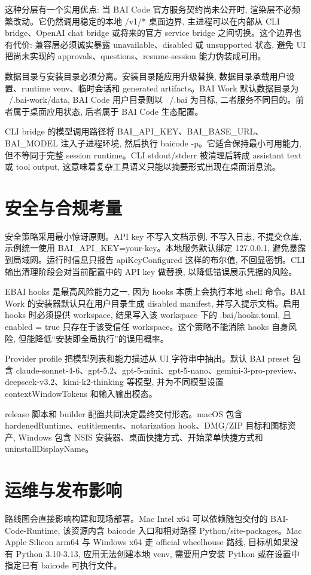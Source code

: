 这种分层有一个实用优点: 当 BAI Code 官方服务契约尚未公开时, 渲染层不必频繁改动。它仍然调用稳定的本地 /v1/* 桌面边界, 主进程可以在内部从 CLI bridge、OpenAI chat bridge 或将来的官方 service bridge 之间切换。这个边界也有代价: 兼容层必须诚实暴露 unavailable、disabled 或 unsupported 状态, 避免 UI 把尚未实现的 approvals、questions、resume-session 能力伪装成可用。

数据目录与安装目录必须分离。安装目录随应用升级替换, 数据目录承载用户设置、runtime venv、临时会话和 generated artifacts。BAI Work 默认数据目录为 ~/.bai-work/data, BAI Code 用户目录则以 ~/.bai 为目标, 二者服务不同目的。前者属于桌面应用状态, 后者属于 BAI Code 生态配置。

CLI bridge 的模型调用路径将 BAI\_API\_KEY、BAI\_BASE\_URL、BAI\_MODEL 注入子进程环境, 然后执行 baicode -p。它适合保持最小可用能力, 但不等同于完整 session runtime。CLI stdout/stderr 被清理后转成 assistant text 或 tool output, 这意味着复杂工具语义只能以摘要形式出现在桌面消息流。

\section{安全与合规考量}
安全策略采用最小惊讶原则。API key 不写入文档示例, 不写入日志, 不提交仓库, 示例统一使用 BAI\_API\_KEY=your-key。本地服务默认绑定 127.0.0.1, 避免暴露到局域网。运行时信息只报告 apiKeyConfigured 这样的布尔值, 不回显密钥。CLI 输出清理阶段会对当前配置中的 API key 做替换, 以降低错误展示凭据的风险。

EBAI hooks 是最高风险能力之一, 因为 hooks 本质上会执行本地 shell 命令。BAI Work 的安装器默认只在用户目录生成 disabled manifest, 并写入提示文档。启用 hooks 时必须提供 workspace, 结果写入该 workspace 下的 .bai/hooks.toml, 且 enabled = true 只存在于该受信任 workspace。这个策略不能消除 hooks 自身风险, 但能降低“安装即全局执行”的误用概率。

Provider profile 把模型列表和能力描述从 UI 字符串中抽出。默认 BAI preset 包含 claude-sonnet-4-6、gpt-5.2、gpt-5-mini、gpt-5-nano、gemini-3-pro-preview、deepseek-v3.2、kimi-k2-thinking 等模型, 并为不同模型设置 contextWindowTokens 和输入输出模态。

release 脚本和 builder 配置共同决定最终交付形态。macOS 包含 hardenedRuntime、entitlements、notarization hook、DMG/ZIP 目标和图标资产, Windows 包含 NSIS 安装器、桌面快捷方式、开始菜单快捷方式和 uninstallDisplayName。

\section{运维与发布影响}
路线图会直接影响构建和现场部署。Mac Intel x64 可以依赖随包交付的 BAI-Code-Runtime, 该资源内含 baicode 入口和相对路径 Python/site-packages。Mac Apple Silicon arm64 与 Windows x64 走 official wheelhouse 路线, 目标机如果没有 Python 3.10-3.13, 应用无法创建本地 venv, 需要用户安装 Python 或在设置中指定已有 baicode 可执行文件。

